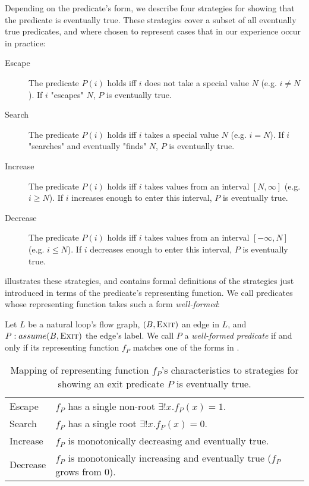Depending on the predicate's form, we describe four strategies for showing that the predicate is eventually true. These strategies cover a subset of all eventually true predicates, and where chosen to represent cases that in our experience occur in practice:

\begin{description}
    \item[Escape] The predicate $P(i)$ holds iff $i$ does not take a special value $N$ (e.g. $i \ne N$). If $i$ "escapes" $N$, $P$ is eventually true.
    \item[Search] The predicate $P(i)$ holds iff $i$ takes a special value $N$ (e.g. $i = N$). If $i$ "searches" and eventually "finds" $N$, $P$ is eventually true.
    \item[Increase] The predicate $P(i)$ holds iff $i$ takes values from an interval $[N,\infty]$ (e.g. $i \ge N$). If $i$ increases enough to enter this interval, $P$ is eventually true.
    \item[Decrease] The predicate $P(i)$ holds iff $i$ takes values from an interval $[-\infty,N]$ (e.g. $i \le N$). If $i$ decreases enough to enter this interval, $P$ is eventually true.
\end{description}

 illustrates these strategies, and  contains formal definitions of the strategies just introduced in terms of the predicate's representing function. We call predicates whose representing function takes such a form \emph{well-formed}:

\begin{definition}
    Let $L$ be a natural loop's flow graph, $(B, \textsc{Exit})$ an edge in $L$, and $P: assume(B, \textsc{Exit})$ the edge's label. We call $P$ a \emph{well-formed predicate} if and only if its representing function $f_P$ matches one of the forms in .
    \label{def:wpred}
\end{definition}

\begin{table}
\begin{tabular}{ll}
    Escape   & $f_P$ has a single non-root $\exists ! x . f_P(x) = 1$.     \\
    Search   & $f_P$ has a single root $\exists ! x . f_P(x) = 0$. \\
    Increase & $f_P$ is monotonically decreasing and eventually true.     \\
    Decrease & $f_P$ is monotonically increasing and eventually true ($f_P$ grows from 0).     \\
\end{tabular}
\caption{Mapping of representing function $f_P$'s characteristics to strategies for showing an exit predicate $P$ is eventually true.}
\label{tab:termstrat}
\end{table}

